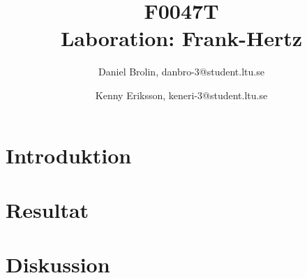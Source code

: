 ﻿\documentclass{article}
\title{F0047T\\Laboration: Frank-Hertz}
\author{Daniel Brolin, danbro-3@student.ltu.se \and Kenny Eriksson, keneri-3@student.ltu.se}
\numberwithin{equation}{section}
\begin{document}
\maketitle
\newpage

\begin{abstract}

\end{abstract}
\newpage
 


\setcounter{page}{1}

\section{Introduktion}

\newpage

\section{Resultat}

\newpage

\section{Diskussion}



\end{document}
